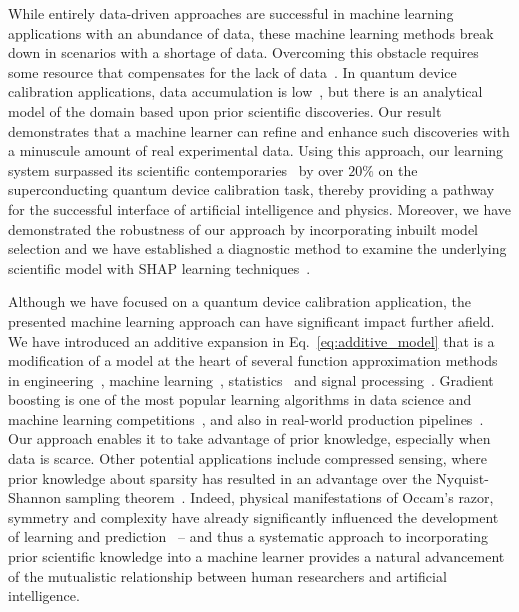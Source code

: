 \documentclass[aps,twocolumn,superscriptaddress,floatfix,preprintnumbers,showkeys]{revtex4}
\begin{document}
While entirely data-driven approaches are successful in machine learning applications with an abundance of data, these machine learning methods break down in scenarios with a shortage of data. Overcoming this obstacle requires some resource that compensates for the lack of data~\cite{Schapire_2002}. In quantum device calibration applications, data accumulation is low~\cite{Roushan_2017}, but there is an analytical model of the domain based upon prior scientific discoveries. Our result demonstrates that a machine learner can refine and enhance such discoveries with a minuscule amount of real experimental data. Using this approach, our learning system surpassed its scientific contemporaries~\cite{Roushan_2017, Neill_2018, Chiaro_2019} by over $20\%$ on the superconducting quantum device calibration task, thereby providing a pathway for the successful interface of artificial intelligence and physics. Moreover, we have demonstrated the robustness of our approach by incorporating inbuilt model selection and we have established a diagnostic method to examine the underlying scientific model with SHAP learning techniques~\cite{Lundberg_2017, Molnar_2020}.

Although we have focused on a quantum device calibration application, the presented machine learning approach can have significant impact further afield. We have introduced an additive expansion in Eq.~\ref{eq:additive_model} that is a modification of a model at the heart of several function approximation methods in engineering~\cite{Powell_1987}, machine learning~\cite{Powell_1987, Schapire_1990, Freund_1995, Freund_1997, Breiman_1997_1, Mason_1999, Chen_2016, Ke_2017}, statistics~\cite{Tukey_1977, Hastie_1990, Friedman_2000, Friedman_2001, Friedman_2003, Hastie_2009} and signal processing~\cite{Mallat_1993, Vincent_2002, Donoho_2012}. Gradient boosting is one of the most popular learning algorithms in data science and machine learning competitions~\cite{Chen_2016, Ke_2017}, and also in real-world production pipelines~\cite{He_2014}. Our approach enables it to take advantage of prior knowledge, especially when data is scarce. Other potential applications include compressed sensing, where prior knowledge about sparsity has resulted in an advantage over the Nyquist-Shannon sampling theorem~\cite{Mallat_1993, Vincent_2002, Donoho_2012}. Indeed, physical manifestations of Occam's razor, symmetry and complexity have already significantly influenced the development of learning and prediction~\cite{Shalizi_2001, Gu_2012, Lin_2017, Udrescu_2020} -- and thus a systematic approach to incorporating prior scientific knowledge into a machine learner provides a natural advancement of the mutualistic relationship between human researchers and artificial intelligence.
\end{document}
